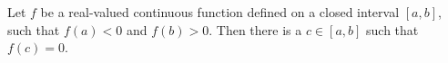 Let $f$ be a real-valued continuous function defined on a closed interval $[a, b]$, such that $f(a) < 0$ and $f(b) > 0$. Then there is a $c \in [a, b]$ such that $f(c) = 0$.
